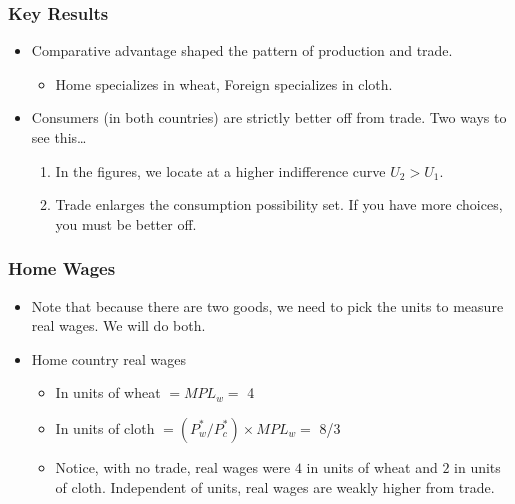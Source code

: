 \documentclass[handout]{beamer}
\begin{document}
\begin{frame}[t]
\frametitle{Key Results}
\bigskip
\begin{itemize}
\item Comparative advantage shaped the pattern of production and trade.
\begin{itemize}
\medskip
\item Home specializes in wheat, Foreign specializes in cloth.
\end{itemize}
\bigskip
\item Consumers (in both countries) are strictly better off from trade. Two ways to see this\ldots
\begin{enumerate}
\medskip
\item In the figures, we locate at a higher indifference curve $U_2 > U_1$.
\medskip
\item Trade enlarges the consumption possibility set. If you have more choices, you must be better off.
\end{enumerate}
\end{itemize}
\end{frame}



\begin{frame}[t]
\frametitle{Home Wages}
\bigskip
\begin{itemize}
\item Note that because there are two goods, we need to pick the units to measure real wages. We will do both.
\bigskip
\item Home country real wages
\begin{itemize}
\medskip
\item In units of wheat $= MPL_w = $ 4
\medskip
\item In units of cloth $ = (P^*_w/P^*_c)\times MPL_w = $ 8/3
\bigskip
\item {\footnotesize Notice, with no trade, real wages were $4$ in units of wheat and $2$ in units of cloth. Independent of units, real wages are weakly higher from trade.}
\end{itemize}
\end{itemize}
\end{frame}


\end{document}
